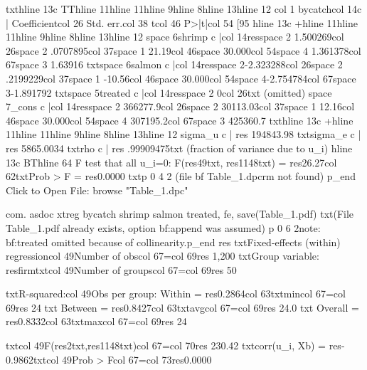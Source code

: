 {txt}{hline 13}{c TT}{hline 11}{hline 11}{hline 9}{hline 8}{hline 13}{hline 12}
{col 1}     bycatch{col 14}{c |} Coefficient{col 26}  Std. err.{col 38}      t{col 46}   P>|t|{col 54}     [95%
{hline 13}{c +}{hline 11}{hline 11}{hline 9}{hline 8}{hline 13}{hline 12}
{space 6}shrimp {c |}{col 14}{res}{space 2} 1.500269{col 26}{space 2} .0707895{col 37}{space 1}   21.19{col 46}{space 3}0.000{col 54}{space 4} 1.361378{col 67}{space 3}  1.63916
{txt}{space 6}salmon {c |}{col 14}{res}{space 2}-2.323288{col 26}{space 2} .2199229{col 37}{space 1}  -10.56{col 46}{space 3}0.000{col 54}{space 4}-2.754784{col 67}{space 3}-1.891792
{txt}{space 5}treated {c |}{col 14}{res}{space 2}        0{col 26}{txt}  (omitted)
{space 7}_cons {c |}{col 14}{res}{space 2} 366277.9{col 26}{space 2} 30113.03{col 37}{space 1}   12.16{col 46}{space 3}0.000{col 54}{space 4} 307195.2{col 67}{space 3} 425360.7
{txt}{hline 13}{c +}{hline 11}{hline 11}{hline 9}{hline 8}{hline 13}{hline 12}
     sigma_u {c |} {res} 194843.98
     {txt}sigma_e {c |} {res} 5865.0034
         {txt}rho {c |} {res} .99909475{txt}   (fraction of variance due to u_i)
{hline 13}{c BT}{hline 64}
F test that all u_i=0: F({res}49{txt}, {res}1148{txt}) = {res}26.27{col 62}{txt}Prob > F = {res}0.0000
{txt}{p 0 4 2}
(file {bf}
Table_1.dpc{rm}
not found)
{p_end}
Click to Open File:  {browse "Table_1.dpc"}

{com}. asdoc xtreg bycatch shrimp salmon treated, fe, save(Table_1.pdf)
{txt}(File Table_1.pdf already exists, option {bf:append} was assumed)
{p 0 6 2}note: {bf:treated} omitted because of collinearity.{p_end}
{res}
{txt}Fixed-effects (within) regression{col 49}Number of obs{col 67}={col 69}{res}     1,200
{txt}Group variable: {res}firm{txt}{col 49}Number of groups{col 67}={col 69}{res}        50

{txt}R-squared:{col 49}Obs per group:
     Within  = {res}0.2864{col 63}{txt}min{col 67}={col 69}{res}        24
{txt}     Between = {res}0.8427{col 63}{txt}avg{col 67}={col 69}{res}      24.0
{txt}     Overall = {res}0.8332{col 63}{txt}max{col 67}={col 69}{res}        24

{txt}{col 49}F({res}2{txt},{res}1148{txt}){col 67}={col 70}{res}   230.42
{txt}corr(u_i, Xb) = {res}-0.9862{txt}{col 49}Prob > F{col 67}={col 73}{res}0.0000

